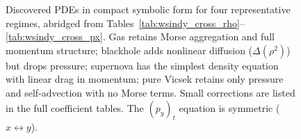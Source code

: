 \begin{figure}[htbp]
\centering
{}
\caption{Discovered PDEs in compact symbolic form for four representative regimes,
abridged from Tables~\ref{tab:wsindy_cross_rho}--\ref{tab:wsindy_cross_px}.
Gas retains Morse aggregation and full momentum structure;
blackhole adds nonlinear diffusion ($\Delta(\rho^2)$) but drops pressure;
supernova has the simplest density equation with linear drag in momentum;
pure Vicsek retains only pressure and self-advection with no Morse terms.
Small corrections are listed in the full coefficient tables.
The $(p_y)_t$ equation is symmetric ($x\leftrightarrow y$).}
\label{fig:ch9_symbolic_pde}
\end{figure}

